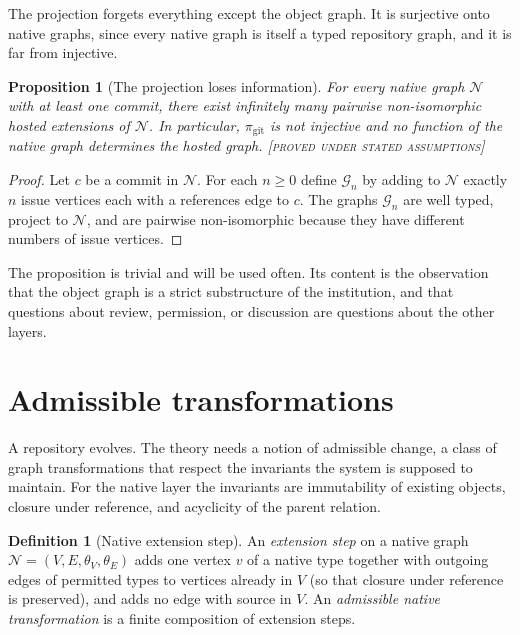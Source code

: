 \documentclass[11pt,twoside,openright]{book}
\theoremstyle{plain}
\newtheorem{proposition}[theorem]{Proposition}
\theoremstyle{definition}
\newtheorem{definition}[theorem]{Definition}
\theoremstyle{remark}
\newcommand{\Proved}{\textup{\textsc{[proved under stated assumptions]}}}
\begin{document}
The projection forgets everything except the object graph. It is surjective onto native graphs, since every native graph is itself a typed repository graph, and it is far from injective.

\begin{proposition}[The projection loses information]\label{prop:projloss}
For every native graph $\mathcal{N}$ with at least one commit, there exist infinitely many pairwise non-isomorphic hosted extensions of $\mathcal{N}$. In particular, $\pi_{\mathrm{git}}$ is not injective and no function of the native graph determines the hosted graph.
\Proved{}
\end{proposition}

\begin{proof}
Let $c$ be a commit in $\mathcal{N}$. For each $n\ge0$ define $\mathcal{G}_n$ by adding to $\mathcal{N}$ exactly $n$ issue vertices each with a references edge to $c$. The graphs $\mathcal{G}_n$ are well typed, project to $\mathcal{N}$, and are pairwise non-isomorphic because they have different numbers of issue vertices.
\end{proof}

The proposition is trivial and will be used often. Its content is the observation that the object graph is a strict substructure of the institution, and that questions about review, permission, or discussion are questions about the other layers.

\section{Admissible transformations}

A repository evolves. The theory needs a notion of admissible change, a class of graph transformations that respect the invariants the system is supposed to maintain. For the native layer the invariants are immutability of existing objects, closure under reference, and acyclicity of the parent relation.

\begin{definition}[Native extension step]\label{def:extstep}
An \emph{extension step} on a native graph $\mathcal{N}=(V,E,\theta_V,\theta_E)$ adds one vertex $v$ of a native type together with outgoing edges of permitted types to vertices already in $V$ (so that closure under reference is preserved), and adds no edge with source in $V$. An \emph{admissible native transformation} is a finite composition of extension steps.
\end{definition}
\end{document}
